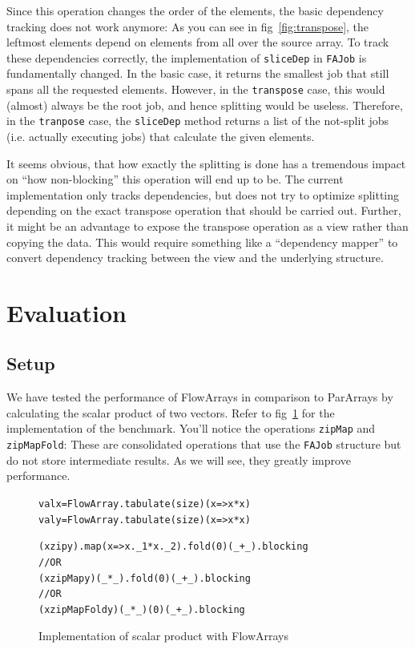 \documentclass[runningheads,a4paper,fleqn]{llncs}
\begin{document}
Since this operation changes the order of the elements, the basic
dependency tracking does not work anymore: As you can see in
fig~\ref{fig:transpose}, the leftmost elements depend on elements from
all over the source array. To track these dependencies correctly, the
implementation of \texttt{sliceDep} in \texttt{FAJob} is fundamentally
changed. In the 
basic case, it returns the smallest job that still spans all the
requested elements. However, in the \texttt{transpose} case, this
would (almost)
always be the root job, and hence splitting would be useless. Therefore,
in the \texttt{tranpose} case, the \texttt{sliceDep} method returns a
list of the not-split jobs (i.e. actually executing jobs) that
calculate the given elements.

It seems obvious, that how exactly the splitting is done has a
tremendous 
impact on ``how non-blocking'' this operation will end up to be. The
current implementation only tracks dependencies, but does not try to
optimize splitting depending on the exact transpose operation that
should be carried out. Further, it might be an advantage to expose the
transpose operation as a view rather than copying the data. This would
require something like a ``dependency mapper'' to convert dependency
tracking between the view and the underlying structure.

\section{Evaluation}
\label{sec:evaluation}

\subsection{Setup}

We have tested the performance of FlowArrays in comparison to
ParArrays by calculating the scalar product of two vectors. Refer to
fig~\ref{fig:scalar-product} for the implementation of the
benchmark. You'll notice the operations \texttt{zipMap} and
\texttt{zipMapFold}: These are consolidated operations that use the
\texttt{FAJob} structure but do not store intermediate results. As we
will see, they greatly improve performance.

\begin{figure}
\begin{minipage}[t]{6cm}
\begin{alltt}
{\scriptsize
val x = FlowArray.tabulate(size)(x => x*x)
val y = FlowArray.tabulate(size)(x => x*x)

(x zip y).map(x => x._1 * x._2).fold(0)(_ + _).blocking
// OR
(x zipMap y)(_ * _).fold(0)(_ + _).blocking
// OR
(x zipMapFold y)(_ * _)(0)(_ + _).blocking
}
\end{alltt}
\end{minipage}
\caption{Implementation of scalar product with FlowArrays}
\label{fig:scalar-product}
\end{figure}
\end{document}
